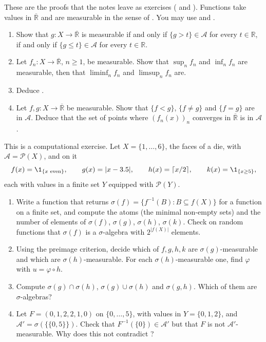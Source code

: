 \begin{exercise}\label{ex:mf-limits}
\medium These are the proofs that the notes leave as exercises
( and ). Functions take values in
$\overline{\mathbb R}$ and are measurable in the sense of . You may use
 and .
\begin{enumerate}[label=(\alph*)]
  \item Show that $g:X\to\overline{\mathbb R}$ is measurable if and only if $\{g>t\}\in\mathcal A$
    for every $t\in\mathbb R$, if and only if $\{g\le t\}\in\mathcal A$ for every $t\in\mathbb R$.
  \item Let $f_n:X\to\overline{\mathbb R}$, $n\ge1$, be measurable. Show that $\sup_nf_n$
    and $\inf_nf_n$ are measurable, then that $\liminf_nf_n$ and $\limsup_nf_n$ are.
  \item Deduce .
  \item Let $f,g:X\to\overline{\mathbb R}$ be measurable. Show that $\{f<g\}$, $\{f\ne g\}$ and
    $\{f=g\}$ are in $\mathcal A$. Deduce that the set of points where $(f_n(x))_n$ converges
    in $\overline{\mathbb R}$ is in $\mathcal A$.
\end{enumerate}
\end{exercise}

\begin{exercise}\label{ex:mf-finite-sigma}
\easy This is a computational exercise. Let $X=\{1,\dots,6\}$, the faces of a die, with
$\mathcal A=\mathcal P(X)$, and on it
\[
  f(x)=\1_{\{x\text{ even}\}},\qquad g(x)=|x-3.5|,\qquad h(x)=\lceil x/2\rceil,\qquad
  k(x)=\1_{\{x\ge5\}},
\]
each with values in a finite set $Y$ equipped with $\mathcal P(Y)$.
\begin{enumerate}[label=(\alph*)]
  \item Write a function that returns $\sigma(f)=\{f^{-1}(B):B\subseteq f(X)\}$ for a function
    on a finite set, and compute the atoms (the minimal non-empty sets) and the number of
    elements of $\sigma(f)$, $\sigma(g)$, $\sigma(h)$, $\sigma(k)$. Check on random functions
    that $\sigma(f)$ is a $\sigma$-algebra with $2^{|f(X)|}$ elements.
  \item Using the preimage criterion, decide which of $f,g,h,k$ are $\sigma(g)$-measurable and
    which are $\sigma(h)$-measurable. For each $\sigma(h)$-measurable one, find $\varphi$ with
    $u=\varphi\circ h$.
  \item Compute $\sigma(g)\cap\sigma(h)$, $\sigma(g)\cup\sigma(h)$ and $\sigma(g,h)$. Which of
    them are $\sigma$-algebras?
  \item Let $F=(0,1,2,2,1,0)$ on $\{0,\dots,5\}$, with values in $Y=\{0,1,2\}$, and
    $\mathcal A'=\sigma(\{\{0,5\}\})$. Check that $F^{-1}(\{0\})\in\mathcal A'$ but that $F$ is not
    $\mathcal A'$-measurable. Why does this not contradict ?
\end{enumerate}
\end{exercise}

